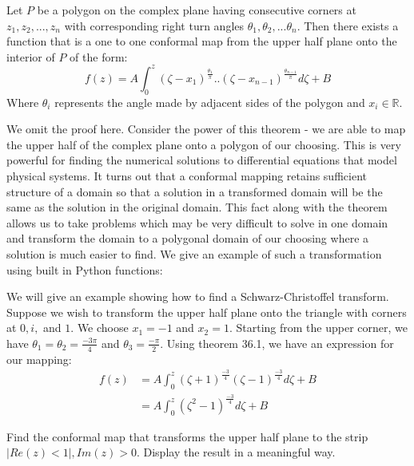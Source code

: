 \begin{theorem}  Let $P$ be a polygon on the complex plane having consecutive corners at $z_1, z_2, ..., z_n$ with corresponding right turn angles $\theta_1, \theta_2,...\theta_n$.  Then there exists a function that is a one to one conformal map from the upper half plane onto the interior of $P$ of the form:
\[
f(z) = A\int_0^z (\zeta - x_1)^{\frac{\theta_1}{\pi}}..(\zeta - x_{n-1})^{\frac{\theta_{n-1}}{\pi}}d\zeta + B
\]
Where $\theta_i$ represents the angle made by adjacent sides of the polygon and $x_i \in \mathbb{R}$.
\end{theorem}

We omit the proof here.  Consider the power of this theorem - we are able to map the upper half of the complex plane onto a polygon of our choosing.  This is very powerful for finding the numerical solutions to differential equations that model physical systems.  It turns out that a conformal mapping retains sufficient structure of a domain so that a solution in a transformed domain will be the same as the solution in the original domain.  This fact along with the theorem allows us to take problems which may be very difficult to solve in one domain and transform the domain to a polygonal domain of our choosing where a solution is much easier to find.  We give an example of such a transformation using built in Python functions:

\begin{example}
We will give an example showing how to find a Schwarz-Christoffel transform.  Suppose we wish to transform the upper half plane onto the triangle with corners at $0, i,$ and $1$.  We choose $x_1 = -1$ and $x_2 = 1$.  Starting from the upper corner, we have $\theta_1 = \theta_2 = \frac{-3\pi}{4}$ and $\theta_3 = \frac{-\pi}{2}$.  Using theorem 36.1, we have an expression for our mapping:
\begin{align*}
f(z) &= A\int_0^z(\zeta + 1)^{\frac{-3}{4}}(\zeta - 1)^{\frac{-3}{4}}d\zeta + B \\
	 &= A\int_0^z(\zeta^2 - 1)^{\frac{-3}{4}}d\zeta + B
\end{align*}

\end{example}

\begin{problem}
Find the conformal map that transforms the upper half plane to the strip $|Re(z) < 1|, Im(z) > 0$.  Display the result in a meaningful way.
\end{problem}
